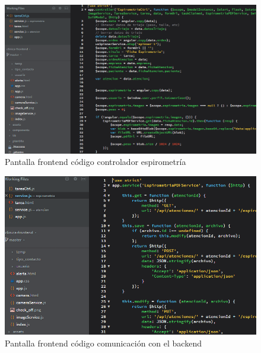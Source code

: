 			\begin{figure}[H]
			    \centering
				\includegraphics[width=16cm]{../imgs/codigo/front-ctrl.png}
				\caption{Pantalla frontend código controlador espirometría}
				\label{figure:front-ctrl}
			\end{figure}
			
			\begin{figure}[H]
			    \centering
				\includegraphics[width=15cm]{../imgs/codigo/front-service.png}
				\caption{Pantalla frontend código comunicación con el backend}
				\label{figure:front-service}
			\end{figure}